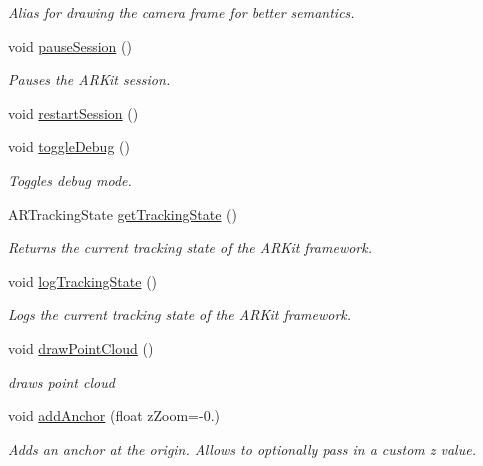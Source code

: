 \begin{DoxyCompactItemize}
\begin{DoxyCompactList}\small\item\em Alias for drawing the camera frame for better semantics. \end{DoxyCompactList}\item 
void \mbox{\hyperlink{class_a_r_processor_a035d352220785ee03e1bb15ba6bf688d}{pause\+Session}} ()
\begin{DoxyCompactList}\small\item\em Pauses the A\+R\+Kit session. \end{DoxyCompactList}\item 
void \mbox{\hyperlink{class_a_r_processor_a121cd3925743680196771ce07058d52e}{restart\+Session}} ()
\item 
void \mbox{\hyperlink{class_a_r_processor_a832585774cbeb04cc181f01c193940b5}{toggle\+Debug}} ()
\begin{DoxyCompactList}\small\item\em Toggles debug mode. \end{DoxyCompactList}\item 
A\+R\+Tracking\+State \mbox{\hyperlink{class_a_r_processor_aa53d195b42b23d9208071692fd5ac28d}{get\+Tracking\+State}} ()
\begin{DoxyCompactList}\small\item\em Returns the current tracking state of the A\+R\+Kit framework. \end{DoxyCompactList}\item 
void \mbox{\hyperlink{class_a_r_processor_a3ae7b56c7d5f555ec84dbd1f1f0a8f65}{log\+Tracking\+State}} ()
\begin{DoxyCompactList}\small\item\em Logs the current tracking state of the A\+R\+Kit framework. \end{DoxyCompactList}\item 
void \mbox{\hyperlink{class_a_r_processor_ae938bf188d56d8b30b141b2fa23e96f8}{draw\+Point\+Cloud}} ()
\begin{DoxyCompactList}\small\item\em draws point cloud \end{DoxyCompactList}\item 
void \mbox{\hyperlink{class_a_r_processor_a535a8b2d9f2d89ab187962fc8f9ba55d}{add\+Anchor}} (float z\+Zoom=-\/0.)
\begin{DoxyCompactList}\small\item\em Adds an anchor at the origin. Allows to optionally pass in a custom z value. \end{DoxyCompactList}\item 

\end{DoxyCompactItemize}
